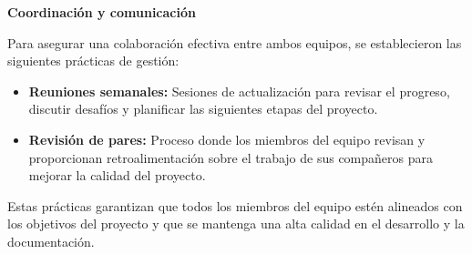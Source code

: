 \textbf{Coordinación y comunicación}

Para asegurar una colaboración efectiva entre ambos equipos, se establecieron las siguientes prácticas de gestión:

\begin{itemize}
    \item \textbf{Reuniones semanales:} Sesiones de actualización para revisar el progreso, discutir desafíos y planificar las siguientes etapas del proyecto.
    \item \textbf{Revisión de pares:} Proceso donde los miembros del equipo revisan y proporcionan retroalimentación sobre el trabajo de sus compañeros para mejorar la calidad del proyecto.
\end{itemize}

Estas prácticas garantizan que todos los miembros del equipo estén alineados con los objetivos del proyecto y que se mantenga una alta calidad en el desarrollo y la documentación.
